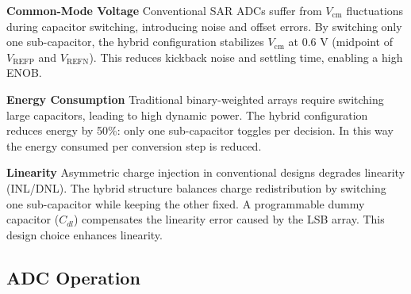 \textbf{Common-Mode Voltage}  
Conventional SAR ADCs suffer from $V_{\text{cm}}$ fluctuations during capacitor switching, introducing noise and offset errors. By switching only one sub-capacitor, the hybrid configuration stabilizes $V_{\text{cm}}$ at 0.6 V (midpoint of $V_{\text{REFP}}$ and $V_{\text{REFN}}$). This reduces kickback noise and settling time, enabling a high ENOB.

\textbf{Energy Consumption}  
Traditional binary-weighted arrays require switching large capacitors, leading to high dynamic power. The hybrid configuration reduces energy by 50\%: only one sub-capacitor toggles per decision. In this way the energy consumed per conversion step is reduced.

\textbf{Linearity}  
Asymmetric charge injection in conventional designs degrades linearity (INL/DNL). The hybrid structure balances charge redistribution by switching one sub-capacitor while keeping the other fixed. A programmable dummy capacitor ($C_{dl}$) compensates the linearity error caused by the LSB array. This design choice enhances linearity.

\subsection{ADC Operation}

